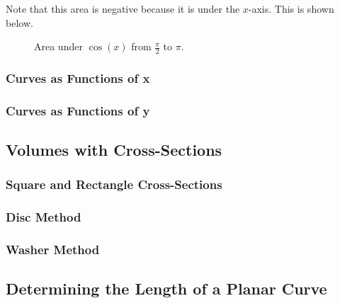 \begin{enumerate}
    Note that this area is negative because it is under the $x$-axis. This is shown below.
    \begin{figure}[H]
        \centering
        \caption{Area under $\cos(x)$ from $\frac{\pi}{2}$ to $\pi$.}
        \label{fig:area_cosx_neg}
    \end{figure}
\end{enumerate}

\subsubsection{Curves as Functions of x}

\subsubsection{Curves as Functions of y}

\subsection{Volumes with Cross-Sections}

\subsubsection{Square and Rectangle Cross-Sections}

\subsubsection{Disc Method}

\subsubsection{Washer Method}

\subsection{Determining the Length of a Planar Curve}
